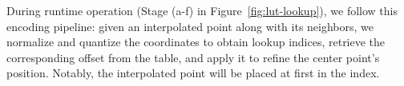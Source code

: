 During runtime operation (Stage (a-f) in Figure~\ref{fig:lut-lookup}), we follow this encoding pipeline: given an interpolated point along with its neighbors, we normalize and quantize the coordinates to obtain lookup indices, retrieve the corresponding offset from the table, and apply it to refine the center point's position. Notably, the interpolated point will be placed at first in the index.





